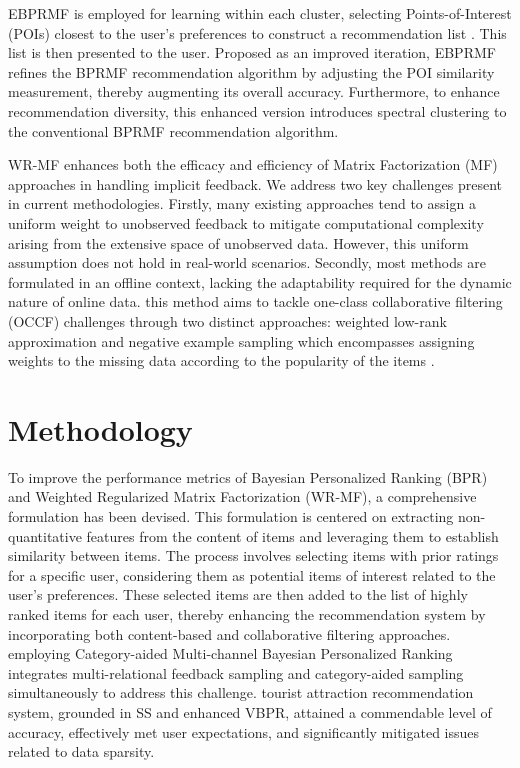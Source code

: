 \documentclass[journal]{IEEEtran}
\begin{document}
EBPRMF is employed for learning within each cluster, selecting Points-of-Interest (POIs) closest to the user's preferences to 
construct a recommendation list \cite{9296759}. This list is then presented to the user. Proposed as an improved iteration, EBPRMF refines 
the BPRMF recommendation algorithm by adjusting the POI similarity measurement, thereby augmenting its overall accuracy. 
Furthermore, to enhance recommendation diversity, this enhanced version introduces spectral clustering to the conventional 
BPRMF recommendation algorithm.

WR-MF \cite{he2017fast} enhances both the efficacy and efficiency of Matrix Factorization (MF) approaches in handling implicit feedback. We address two key 
challenges present in current methodologies. Firstly, many existing approaches tend to assign a uniform weight to unobserved 
feedback to mitigate computational complexity arising from the extensive space of unobserved data. However, this uniform 
assumption does not hold in real-world scenarios. Secondly, most methods are formulated in an offline context, lacking the 
adaptability required for the dynamic nature of online data. this method aims to tackle one-class collaborative filtering (OCCF) 
challenges through two distinct approaches: weighted low-rank approximation and negative example sampling which encompasses
assigning weights to the missing data according to the popularity of the items \cite{he2017fast}.

\section{Methodology}

To improve the performance metrics of Bayesian Personalized Ranking (BPR) and Weighted Regularized Matrix Factorization 
(WR-MF), a comprehensive formulation has been devised. This formulation is centered on extracting non-quantitative 
features from the content of items and leveraging them to establish similarity between items. The process involves 
selecting items with prior ratings for a specific user, considering them as potential items of interest related to 
the user's preferences. These selected items are then added to the list of highly ranked items for each user, thereby 
enhancing the recommendation system by incorporating both content-based and collaborative filtering approaches.
employing Category-aided Multi-channel Bayesian Personalized Ranking \cite{8689028} integrates multi-relational feedback sampling 
and category-aided sampling simultaneously to address this challenge. tourist attraction recommendation system, grounded in SS and 
enhanced VBPR, attained a commendable level of accuracy, effectively met user expectations, and significantly mitigated issues 
related to data sparsity.
\end{document}
